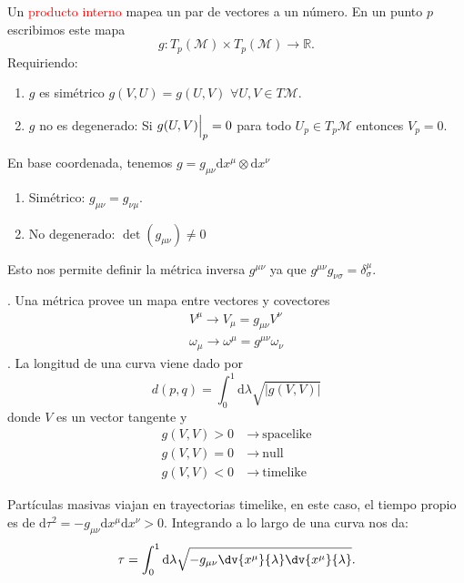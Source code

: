 \documentclass[../main]{subfiles}
\begin{document}
\begin{adjustwidth}{0pt}{-100pt}
 Un \textcolor{red}{producto interno} mapea un par de vectores a un número. En un punto $p$ escribimos este mapa 
\begin{equation}
    g: T_p(\mathcal{M}) \times T_p(\mathcal{M})\rightarrow \mathbb{R}.
\end{equation}
Requiriendo:
\begin{enumerate}
    \item $g$ es simétrico $g(V, U)=g(U, V)$ $\forall U, V \in T\mathcal{M}$.
    \item $g$ no es degenerado: Si $g(U, V)\Big{|}_p=0$ para todo $U_p \in T_p \mathcal{M}$ entonces $V_p=0$.
\end{enumerate}
En base coordenada, tenemos $g=g_{\mu\nu} \mathrm{d}x^{\mu}\otimes \mathrm{d}x^{\nu}$
\begin{enumerate}
    \item Simétrico: $g_{\mu\nu}=g_{\nu\mu}$.
    \item No degenerado: $\det (g_{\mu\nu})\neq 0$
\end{enumerate}
Esto nos permite definir la métrica inversa $g^{\mu\nu}$ ya que $g^{\mu\nu}g_{\nu\sigma}=\delta^{\mu}_{\sigma}$.

\proposicion{\textcolor{red}{(La métrica como una mapa dual)}}. Una métrica provee un mapa entre vectores y covectores 
\begin{equation}
    \begin{split}
        V^{\mu} \rightarrow V_{\mu}=g_{\mu\nu} V^{\nu}\\
        \omega_{\mu} \rightarrow \omega^{\mu}=g^{\mu\nu} \omega_{\nu}
    \end{split}
\end{equation}
. La longitud de una curva viene dado por 
\begin{equation}
    d(p, q)=\int_0^1 \mathrm{d}\lambda \sqrt{|g(V, V)|}
\end{equation}
donde $V$ es un vector tangente y 
\begin{equation}
    \begin{split}
        g(V, V)>0 &\ \rightarrow \ \text{spacelike}\\
        g(V, V)=0 &\ \rightarrow \ \text{null}\\
        g(V, V)<0 &\ \rightarrow \ \text{timelike}
    \end{split}
\end{equation}

Partículas masivas viajan en trayectorias timelike, en este caso, el tiempo propio es de $\mathrm{d}\tau^2=-g_{\mu\nu} \mathrm{d}x^{\mu}\mathrm{d}x^{\nu}>0$. Integrando a lo largo de una curva nos da:
\begin{equation}
    \tau=\int_0^1 \mathrm{d}\lambda \sqrt{-g_{\mu\nu} \dv{x^{\mu}}{\lambda}\dv{x^{\mu}}{\lambda}}.
\end{equation}


\end{adjustwidth}
\end{document}
